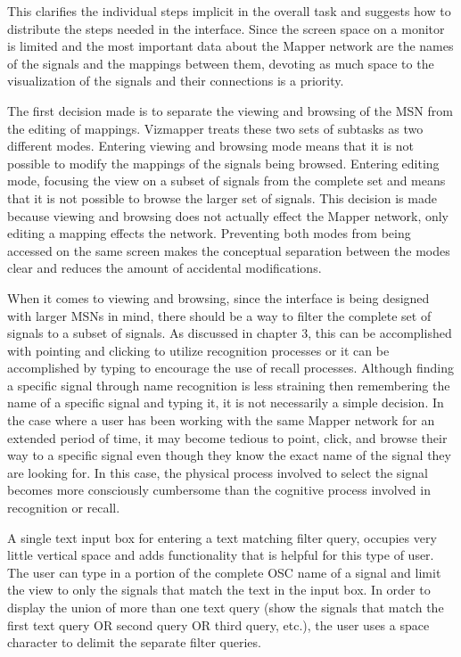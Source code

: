 This clarifies the individual steps implicit in the overall task and suggests how to distribute the steps needed in the interface. Since the screen space on a monitor is limited and the most important data about the Mapper network are the names of the signals and the mappings between them, devoting as much space to the visualization of the signals and their connections is a priority.

The first decision made is to separate the viewing and browsing of the MSN from the editing of mappings. Vizmapper treats these two sets of subtasks as two different modes. Entering viewing and browsing mode means that it is not possible to modify the mappings of the signals being browsed. Entering editing mode, focusing the view on a subset of signals from the complete set and means that it is not possible to browse the larger set of signals. This decision is made because viewing and browsing does not actually effect the Mapper network, only editing a mapping effects the network. Preventing both modes from being accessed on the same screen makes the conceptual separation between the modes clear and reduces the amount of accidental modifications.

When it comes to viewing and browsing, since the interface is being designed with larger MSNs in mind, there should be a way to filter the complete set of signals to a subset of signals. As discussed in chapter 3, this can be accomplished with pointing and clicking to utilize recognition processes or it can be accomplished by typing to encourage the use of recall processes. Although finding a specific signal through name recognition is less straining then remembering the name of a specific signal and typing it, it is not necessarily a simple decision. In the case where a user has been working with the same Mapper network for an extended period of time, it may become tedious to point, click, and browse their way to a specific signal even though they know the exact name of the signal they are looking for. In this case, the physical process involved to select the signal becomes more consciously cumbersome than the cognitive process involved in recognition or recall.

A single text input box for entering a text matching filter query, occupies very little vertical space and adds functionality that is helpful for this type of user. The user can type in a portion of the complete OSC name of a signal and limit the view to only the signals that match the text in the input box. In order to display the union of more than one text query (show the signals that match the first text query OR second query OR third query, etc.), the user uses a space character to delimit the separate filter queries. 

